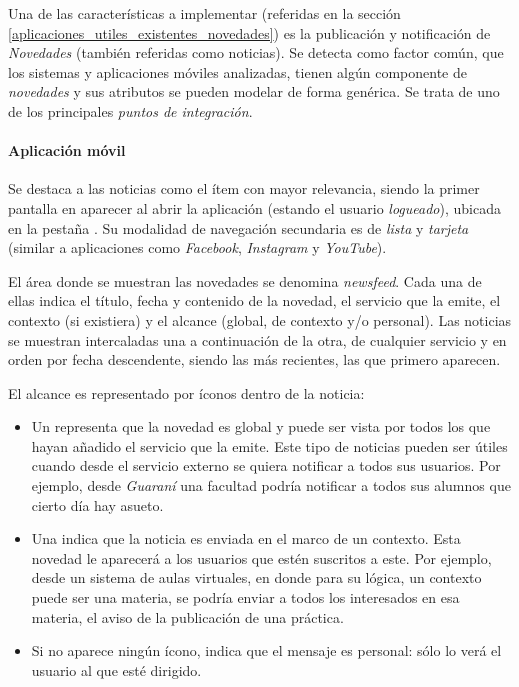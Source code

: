 Una de las características a implementar (referidas en la sección \ref{aplicaciones_utiles_existentes_novedades}) es la publicación y notificación de \textit{Novedades} (también referidas como noticias). Se detecta como factor común, que los sistemas y aplicaciones móviles analizadas, tienen algún componente de \textit{novedades} y sus atributos se pueden modelar de forma genérica. Se trata de uno de los principales \textit{puntos de integración}.

\paragraph{Aplicación móvil}
\label{funcionalidad_noticias_app}

Se destaca a las noticias como el ítem con mayor relevancia, siendo la primer pantalla en aparecer al abrir la aplicación (estando el usuario \textit{logueado}), ubicada en la pestaña .
Su modalidad de navegación secundaria es de \textit{lista} y \textit{tarjeta} (similar a aplicaciones como \textit{Facebook}, \textit{Instagram} y \textit{YouTube}).


El área donde se muestran las novedades se denomina \textit{newsfeed}. Cada una de ellas indica el título, fecha y contenido de la novedad, el servicio que la emite, el contexto (si existiera) y el alcance (global, de contexto y/o personal). Las noticias se muestran intercaladas una a continuación de la otra, de cualquier servicio y en orden por fecha descendente, siendo las más recientes, las que primero aparecen.

El alcance es representado por íconos dentro de la noticia:
\begin{itemize}
\item Un  representa que la novedad es global y puede ser vista por todos los que hayan añadido el servicio que la emite. Este tipo de noticias pueden ser útiles cuando desde el servicio externo se quiera notificar a todos sus usuarios. Por ejemplo, desde \textit{Guaraní} una facultad podría notificar a todos sus alumnos que cierto día hay asueto.
\item Una  indica que la noticia es enviada en el marco de un contexto. Esta novedad le aparecerá a los usuarios que estén suscritos a este. Por ejemplo, desde un sistema de aulas virtuales, en donde para su lógica, un contexto puede ser una materia, se podría enviar a todos los interesados en esa materia, el aviso de la publicación de una práctica. 
\item Si no aparece ningún ícono, indica que el mensaje es personal: sólo lo verá el usuario al que esté dirigido.
\end{itemize}



